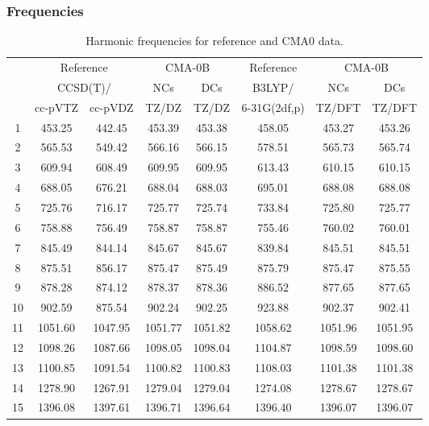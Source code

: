\documentclass[10pt,oneside]{article}
\begin{document}
\clearpage

\subsubsection*{Frequencies}
\begin{table}[h!]
\centering
\caption{Harmonic frequencies for reference and CMA0 data.}
\begin{tabular}{cccccccc}
\toprule
{} & \multicolumn{2}{c}{Reference} & \multicolumn{2}{c}{CMA-0B} &    Reference & \multicolumn{2}{c}{CMA-0B} \\
{} & \multicolumn{2}{c}{CCSD(T)/} &     NCs &     DCs &       B3LYP/ &     NCs &     DCs \\
{} &   cc-pVTZ & cc-pVDZ &   TZ/DZ &   TZ/DZ & 6-31G(2df,p) &  TZ/DFT &  TZ/DFT \\
\midrule
1  &    453.25 &  442.45 &  453.39 &  453.38 &       458.05 &  453.27 &  453.26 \\
2  &    565.53 &  549.42 &  566.16 &  566.15 &       578.51 &  565.73 &  565.74 \\
3  &    609.94 &  608.49 &  609.95 &  609.95 &       613.43 &  610.15 &  610.15 \\
4  &    688.05 &  676.21 &  688.04 &  688.03 &       695.01 &  688.08 &  688.08 \\
5  &    725.76 &  716.17 &  725.77 &  725.74 &       733.84 &  725.80 &  725.77 \\
6  &    758.88 &  756.49 &  758.87 &  758.87 &       755.46 &  760.02 &  760.01 \\
7  &    845.49 &  844.14 &  845.67 &  845.67 &       839.84 &  845.51 &  845.51 \\
8  &    875.51 &  856.17 &  875.47 &  875.49 &       875.79 &  875.47 &  875.55 \\
9  &    878.28 &  874.12 &  878.37 &  878.36 &       886.52 &  877.65 &  877.65 \\
10 &    902.59 &  875.54 &  902.24 &  902.25 &       923.88 &  902.37 &  902.41 \\
11 &   1051.60 & 1047.95 & 1051.77 & 1051.82 &      1058.62 & 1051.96 & 1051.95 \\
12 &   1098.26 & 1087.66 & 1098.05 & 1098.04 &      1104.87 & 1098.59 & 1098.60 \\
13 &   1100.85 & 1091.54 & 1100.82 & 1100.83 &      1108.03 & 1101.38 & 1101.38 \\
14 &   1278.90 & 1267.91 & 1279.04 & 1279.04 &      1274.08 & 1278.67 & 1278.67 \\
15 &   1396.08 & 1397.61 & 1396.71 & 1396.64 &      1396.40 & 1396.07 & 1396.07 \\

\end{tabular}
\end{table}
\end{document}
